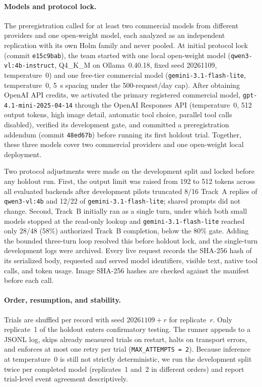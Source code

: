 \documentclass[runningheads]{llncs}
\begin{document}
\paragraph{Models and protocol lock.} The preregistration called for at least two commercial models from different providers and one open-weight model, each analyzed as an independent replication with its own Holm family and never pooled. At initial protocol lock (commit \texttt{e15c9bab}), the team started with one local open-weight model (\texttt{qwen3-vl:4b-instruct}, Q4\_K\_M on Ollama~0.40.18, fixed seed 20261109, temperature~0) and one free-tier commercial model (\texttt{gemini-3.1-flash-lite}, temperature~0, 5~s spacing under the 500-request/day cap). After obtaining OpenAI API credits, we activated the primary registered commercial model, \texttt{gpt-4.1-mini-2025-04-14} through the OpenAI Responses API (temperature~0, 512 output tokens, high image detail, automatic tool choice, parallel tool calls disabled), verified its development gate, and committed a preregistration addendum (commit \texttt{48ed67b}) before running its first holdout trial. Together, these three models cover two commercial providers and one open-weight local deployment.

Two protocol adjustments were made on the development split and locked before any holdout run. First, the output limit was raised from 192 to 512 tokens across all evaluated backends after development pilots truncated 8/16 Track~A replies of \texttt{qwen3-vl:4b} and 12/22 of \texttt{gemini-3.1-flash-lite}; shared prompts did not change. Second, Track~B initially ran as a single turn, under which both small models stopped at the read-only lookup and \texttt{gemini-3.1-flash-lite} reached only 28/48 (58\%) authorized Track~B completion, below the 80\% gate. Adding the bounded three-turn loop resolved this before holdout lock, and the single-turn development logs were archived. Every live request records the SHA-256 hash of its serialized body, requested and served model identifiers, visible text, native tool calls, and token usage. Image SHA-256 hashes are checked against the manifest before each call.

\paragraph{Order, resumption, and stability.} Trials are shuffled per record with seed $20261109 + r$ for replicate~$r$. Only replicate~1 of the holdout enters confirmatory testing. The runner appends to a JSONL log, skips already measured trials on restart, halts on transport errors, and enforces at most one retry per trial (\texttt{MAX\_ATTEMPTS = 2}). Because inference at temperature~0 is still not strictly deterministic, we run the development split twice per completed model (replicates~1 and~2 in different orders) and report trial-level event agreement descriptively.
\end{document}
